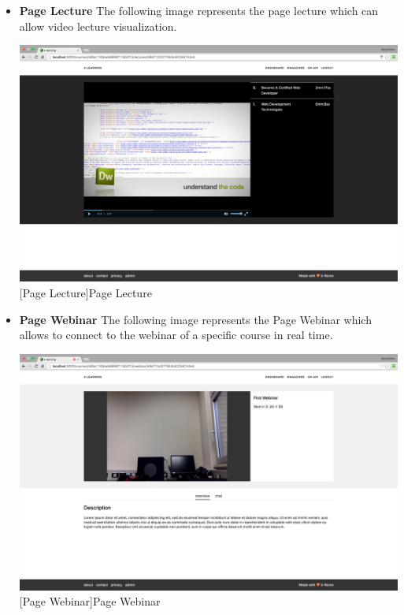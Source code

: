 \begin{itemize}
\item \textbf{Page Lecture} The following image represents the page lecture which can allow video lecture visualization.
\\
\par

\begin{minipage}{\linewidth}
    \centering
    \includegraphics[width=0.9\linewidth]{images/chapter4/page-lecture.png}
    [Page Lecture]{Page Lecture}
\end{minipage}


\item \textbf{Page Webinar} The following image represents the Page Webinar which allows to connect to the webinar of a specific course in real time.
\\
\par
\begin{minipage}{\linewidth}
    \centering
    \includegraphics[width=0.9\linewidth]{images/chapter4/page-webinar.png}
    [Page Webinar]{Page Webinar}
\end{minipage}

\end{itemize}